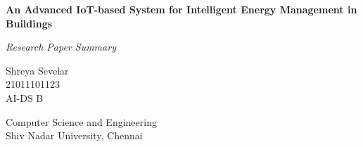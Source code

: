 \begin{titlepage}
    \centering
        \vspace*{2cm}
        \Huge
        \textbf{An Advanced IoT-based System for Intelligent Energy
Management in Buildings}
        
        \vspace*{0.6cm}
        \Large
        \textit{Research Paper Summary}
        
        \normalsize
        \vspace*{1.5cm}
        Shreya Sevelar\\
        \vspace{0.2cm}
        21011101123\\
        \vspace{0.2cm}
        AI-DS B\\
        
        \vfill
       
        
        Computer Science and Engineering\\
        Shiv Nadar University, Chennai\\
        \vspace*{1cm}
    
\end{titlepage}
